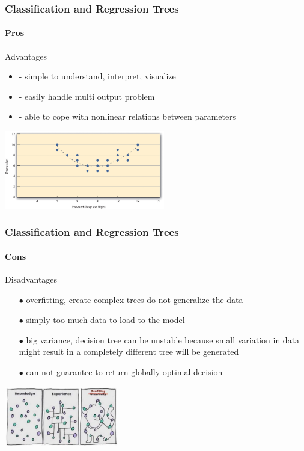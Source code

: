 \begin{frame}
	\frametitle{Classification and Regression Trees}
		\framesubtitle{Pros}

		\begin{center}
		Advantages
		\begin{itemize}
		  \item - simple to understand, interpret, visualize
		  \item - easily handle multi output problem
		  \item - able to cope with nonlinear relations between parameters
		\end{itemize}
		
		\vfill
		
		\includegraphics[width=7cm]{./figures/pros}
		\end{center}
		
\end{frame}

\begin{frame}
	\frametitle{Classification and Regression Trees}
		\framesubtitle{Cons}

		\begin{center}
		Disadvantages
		\begin{itemize}
		   \item[$\bullet$] overfitting, create complex trees do not generalize the data
		   \item[$\bullet$] simply too much data to load to the model 
		   \item[$\bullet$] big variance, decision tree can be unstable because small variation in data might result  in a completely different tree will be generated
		   \item[$\bullet$] can not guarantee to return globally optimal decision
		\end{itemize}
		
		\vfill
		
		\includegraphics[width=5cm]{./figures/cons}
		\end{center}
		
\end{frame}

